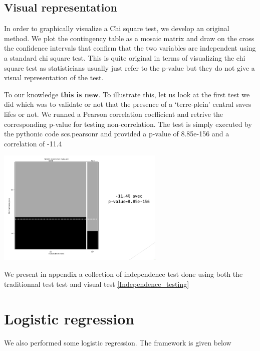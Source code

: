 \documentclass[a4paper]{article}
\theoremstyle{definition}
\theoremstyle{proposition}
\begin{document}
\subsection{Visual representation}
In order to graphically visualize a Chi square test, we develop an original method. We plot the contingency table as a mosaic matrix and draw on the cross the confidence intervals that confirm that the two variables are independent using a standard chi square test. This is quite original in terms of visualizing the chi square test as statisticians usually just refer to the p-value but they do not give a visual representation of the test. 

To our knowledge \textbf{this is new}. 
To illustrate this, let us look at the first test we did which was to validate or not that the presence of a `terre-plein' central saves lifes or not. We runned a Pearson correlation coefficient and retrive the corresponding p-value for testing non-correlation.
The test is simply executed by the pythonic code  scs.pearsonr and provided a p-value of 8.85e-156 and a correlation of -11.4%

\includegraphics[width=8cm]{indep_1_test.png}\label{indep_1_test}

We present in appendix a collection of independence test done using both the traditionnal test test and visual test \ref{Independence_testing}


\section{Logistic regression}
We also performed some logistic regression. The framework is given below
\end{document}
